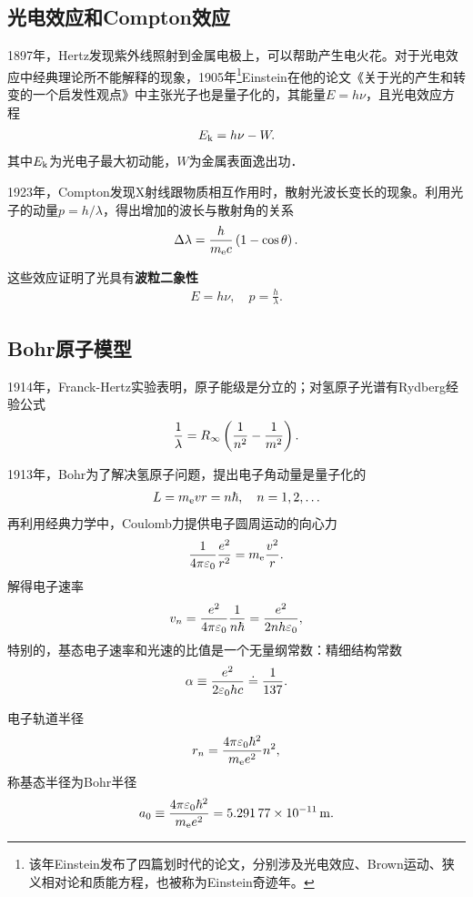 \subsection{光电效应和Compton效应}
1897年，Hertz发现紫外线照射到金属电极上，可以帮助产生电火花。对于光电效应中经典理论所不能解释的现象，1905年\footnote{该年Einstein发布了四篇划时代的论文，分别涉及光电效应、Brown运动、狭义相对论和质能方程，也被称为Einstein奇迹年。}Einstein在他的论文《关于光的产生和转变的一个启发性观点》中主张光子也是量子化的，其能量$E=h\nu$，且光电效应方程
\begin{align}
	E_{\mathrm k}=h\nu-W.
\end{align}
其中$E_{\mathrm k}$为光电子最大初动能，$W$为金属表面逸出功．

1923年，Compton发现X射线跟物质相互作用时，散射光波长变长的现象。利用光子的动量$p=h/\lambda$，得出增加的波长与散射角的关系
\begin{align}
	\Delta\lambda=\frac h{m_\mathrm e c}\left(1-\cos\theta\right).
\end{align}

这些效应证明了光具有\textbf{波粒二象性}
\begin{align}
	E=h\nu,\quad p=\frac h\lambda.
\end{align}
\subsection{Bohr原子模型}
1914年，Franck-Hertz实验表明，原子能级是分立的；对氢原子光谱有Rydberg经验公式
\begin{align}
	\frac1\lambda=R_\infty\left(\frac1{n^2}-\frac1{m^2}\right).
\end{align}

1913年，Bohr为了解决氢原子问题，提出电子角动量是量子化的
\begin{align}
	L=m_\mathrm e vr=n\hbar,\quad n=1,2,\ldots
\end{align}
再利用经典力学中，Coulomb力提供电子圆周运动的向心力
\[
	\frac1{4\pi\varepsilon_0}\frac{e^2}{r^2}=m_\mathrm e\frac{v^2}r.
\]
解得电子速率
\begin{align}
	v_n=\frac{e^2}{4\pi\varepsilon_0}\frac{1}{n\hbar}=\frac{e^2}{2nh\varepsilon_0},
\end{align}
特别的，基态电子速率和光速的比值是一个无量纲常数：精细结构常数
\[
	\alpha\equiv\frac{e^2}{2\varepsilon_0 hc}\doteq\frac1{137}.
\]

电子轨道半径
\begin{align}
	r_n=\frac{4\pi\varepsilon_0\hbar^2}{m_\mathrm e e^2}n^2,
\end{align}
称基态半径为Bohr半径
\[
a_0\equiv\frac{4\pi\varepsilon_0\hbar^2}{m_\mathrm e e^2}=\SI{5.29177e-11}{m}.
\]

